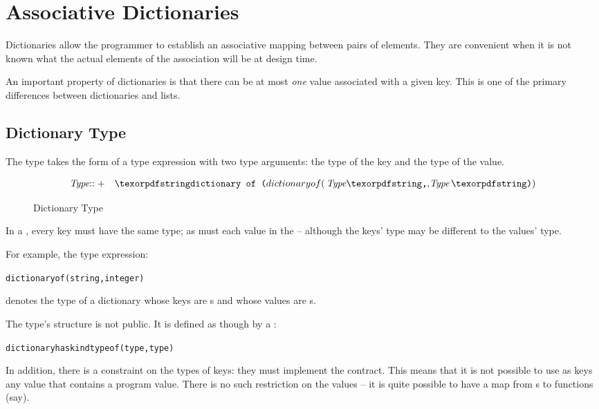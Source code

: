\chapter{Associative Dictionaries}
\label{associativeMap}

Dictionaries allow the programmer to establish an associative mapping between pairs of elements. They are convenient when it is not known what the actual elements of the association will be at design time.

\begin{aside}
An important property of dictionaries is that there can be at most \emph{one} value associated with a given key. This is one of the primary differences between dictionaries and lists.
\end{aside}

\section{Dictionary Type}
\label{mapTypes}

The  type takes the form of a type expression with two type arguments: the type of the key and the type of the value.
\begin{figure}[htbp]
\begin{eqnarray*}
\emph{Type}&\arrowplus&\q{dictionary of (}\,\emph{Type}\q{,}\emph{Type}\,\q{)}
\end{eqnarray*}
\caption{Dictionary Type}
\label{mapTypeFig}
\end{figure}
In a , every key must have the same type; as must each value in the  -- although the keys' type may be different to the values' type.

For example, the type expression:
\begin{alltt}
dictionary of (string,integer)
\end{alltt}
denotes the type of a dictionary whose keys are s and whose values are s.

The  type's structure is not public. It is defined as though by a :
\begin{alltt}
dictionary has kind type of (type,type)
\end{alltt}
\begin{aside}
In addition, there is a constraint on the types of keys: they must implement the  contract. This means that it is not possible to use as keys any value that contains a program value. There is no such restriction on the values -- it is quite possible to have a map from s to functions (say).
\end{aside}


